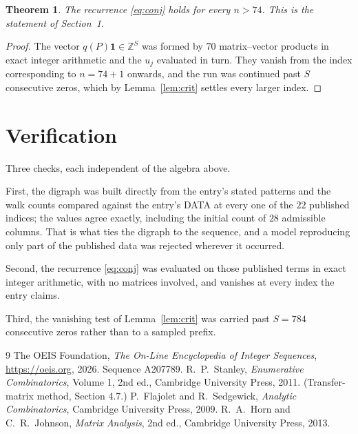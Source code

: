 \documentclass[11pt,a4paper]{article}
\theoremstyle{plain}
\newtheorem{theorem}{Theorem}
\theoremstyle{definition}
\begin{document}
\begin{theorem}
The recurrence \eqref{eq:conj} holds for every $n>74$. This is the statement of
Section~1.
\end{theorem}

\begin{proof}
The vector $q(P)\mathbf{1}\in\mathbb{Z}^{S}$ was formed by $70$ matrix--vector
products in exact integer arithmetic and the $u_j$ evaluated in turn. They vanish from the
index corresponding to $n=74+1$ onwards, and the run was continued past $S$ consecutive
zeros, which by Lemma~\ref{lem:crit} settles every larger index.
\end{proof}

\section{Verification}

Three checks, each independent of the algebra above.

First, the digraph was built directly from the entry's stated patterns and the walk counts
compared against the entry's DATA at every one of the $22$ published indices; the
values agree exactly, including the initial count of $28$ admissible columns. That is
what ties the digraph to the sequence, and a model reproducing only part of the published
data was rejected wherever it occurred.

Second, the recurrence \eqref{eq:conj} was evaluated on those published terms in exact
integer arithmetic, with no matrices involved, and vanishes at every index the entry claims.

Third, the vanishing test of Lemma~\ref{lem:crit} was carried past $S=784$ consecutive
zeros rather than to a sampled prefix.

\begin{thebibliography}{9}
 The OEIS Foundation, \emph{The On-Line Encyclopedia of Integer
Sequences}, \url{https://oeis.org}, 2026. Sequence A207789.
 R.~P.~Stanley, \emph{Enumerative Combinatorics}, Volume 1, 2nd ed.,
Cambridge University Press, 2011. (Transfer-matrix method, Section 4.7.)
 P.~Flajolet and R.~Sedgewick, \emph{Analytic Combinatorics}, Cambridge
University Press, 2009.
 R.~A.~Horn and C.~R.~Johnson, \emph{Matrix Analysis}, 2nd ed., Cambridge
University Press, 2013.
\end{thebibliography}
\end{document}
